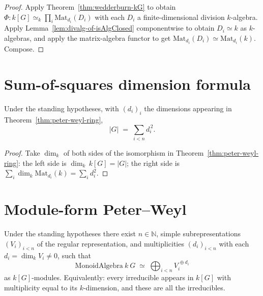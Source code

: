 \begin{proof}
  Apply Theorem~\ref{thm:wedderburn-kG} to obtain
  $\Phi : k[G] \simeq_{\!k} \prod_i \mathrm{Mat}_{d_i}(D_i)$ with each $D_i$
  a finite-dimensional division $k$-algebra. Apply
  Lemma~\ref{lem:divalg-of-isAlgClosed} componentwise to obtain $D_i \simeq k$
  as $k$-algebras, and apply the matrix-algebra functor to get
  $\mathrm{Mat}_{d_i}(D_i) \simeq \mathrm{Mat}_{d_i}(k)$. Compose.
\end{proof}

\section{Sum-of-squares dimension formula}

\begin{corollary}
  \label{cor:sum-of-squares}
  Under the standing hypotheses, with $(d_i)_i$ the dimensions appearing in
  Theorem~\ref{thm:peter-weyl-ring},
  \[
     |G| \;=\; \sum_{i < n} d_i^{\,2}.
  \]
\end{corollary}

\begin{proof}
  Take $\dim_k$ of both sides of the isomorphism in
  Theorem~\ref{thm:peter-weyl-ring}: the left side is
  $\dim_k\,k[G] = |G|$; the right side is
  $\sum_i \dim_k \mathrm{Mat}_{d_i}(k) = \sum_i d_i^2$.
\end{proof}

\section{Module-form Peter–Weyl}

\begin{theorem}
  \label{thm:peter-weyl-module}
  Under the standing hypotheses there exist $n \in \mathbb N$, simple
  subrepresentations $(V_i)_{i < n}$ of the regular representation, and
  multiplicities $(d_i)_{i < n}$ with each $d_i = \dim_k V_i \ne 0$, such
  that
  \[
     \mathrm{MonoidAlgebra}\ k\ G \;\simeq\; \bigoplus_{i < n} V_i^{\,\oplus d_i}
  \]
  as $k[G]$-modules. Equivalently: every irreducible appears in $k[G]$ with
  multiplicity equal to its $k$-dimension, and these are all the irreducibles.
\end{theorem}

